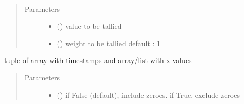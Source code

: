 \documentclass[letterpaper,10pt,english]{sphinxmanual}
\begin{document}
\begin{fulllineitems}
\begin{fulllineitems}
\label{\detokenize{Reference:salabim.Monitor.tally}}~\begin{quote}\begin{description}
\item[{Parameters}] \leavevmode\begin{itemize}
\item {} 
 (\sphinxstyleliteralemphasis{\sphinxupquote{, }}\sphinxstyleliteralemphasis{\sphinxupquote{, }}) \textendash{} value to be tallied

\item {} 
 () \textendash{} weight to be tallied 
default : 1 

\end{itemize}

\end{description}\end{quote}

\end{fulllineitems}


\begin{fulllineitems}
\label{\detokenize{Reference:salabim.Monitor.tx}}
tuple of array with timestamps and array/list with x-values
\begin{quote}\begin{description}
\item[{Parameters}] \leavevmode\begin{itemize}
\item {} 
 () \textendash{} if False (default), include zeroes. if True, exclude zeroes


\end{itemize}
\end{description}
\end{quote}
\end{fulllineitems}
\end{fulllineitems}
\end{document}
